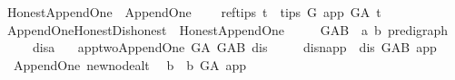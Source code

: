 \begin{isabellebody}
\isanewline
{}\isamarkupfalse%
\ Honest{\isacharunderscore}{\kern0pt}Append{\isacharunderscore}{\kern0pt}One\ {\isacharequal}{\kern0pt}\ Append{\isacharunderscore}{\kern0pt}One\ {\isacharplus}{\kern0pt}\isanewline
\ \ \ ref{\isacharunderscore}{\kern0pt}tips{\isacharcolon}{\kern0pt}\ {\isachardoublequoteopen}{\isasymforall}t\ {\isasymin}\ tips\ G{\isachardot}{\kern0pt}\ app\ {\isasymrightarrow}\isactrlbsub G{\isacharunderscore}{\kern0pt}A\isactrlesub \ t{\isachardoublequoteclose}\ \ \isanewline
\ \ \isanewline
{}\isamarkupfalse%
\ Append{\isacharunderscore}{\kern0pt}One{\isacharunderscore}{\kern0pt}Honest{\isacharunderscore}{\kern0pt}Dishonest\ {\isacharequal}{\kern0pt}\ Honest{\isacharunderscore}{\kern0pt}Append{\isacharunderscore}{\kern0pt}One\ {\isacharplus}{\kern0pt}\ \isanewline
\ \ \ G{\isacharunderscore}{\kern0pt}AB\ {\isacharcolon}{\kern0pt}{\isacharcolon}{\kern0pt}\ {\isachardoublequoteopen}{\isacharparenleft}{\kern0pt}{\isacharprime}{\kern0pt}a{\isacharcomma}{\kern0pt}\ {\isacharprime}{\kern0pt}b{\isacharparenright}{\kern0pt}\ pre{\isacharunderscore}{\kern0pt}digraph{\isachardoublequoteclose}\ {\isacharparenleft}{\kern0pt}\isanewline
\ \ \ \ \ dis{\isacharcolon}{\kern0pt}{\isacharcolon}{\kern0pt}{\isacharprime}{\kern0pt}a\isanewline
\ \ \ app{\isacharunderscore}{\kern0pt}two{\isacharcolon}{\kern0pt}{\isachardoublequoteopen}Append{\isacharunderscore}{\kern0pt}One\ G{\isacharunderscore}{\kern0pt}A\ G{\isacharunderscore}{\kern0pt}AB\ dis{\isachardoublequoteclose}\isanewline
\ \ \ \ \ dis{\isacharunderscore}{\kern0pt}n{\isacharunderscore}{\kern0pt}app{\isacharcolon}{\kern0pt}\ {\isachardoublequoteopen}{\isasymnot}\ dis\ {\isasymrightarrow}\isactrlbsub G{\isacharunderscore}{\kern0pt}AB\isactrlesub \ app{\isachardoublequoteclose}%
\isadelimdocument
%
\endisadelimdocument
%
\isatagdocument
%
\isamarkuptrue%
%
\endisatagdocument
{\isafolddocument}%
%
\isadelimdocument
%
\endisadelimdocument
{}\isamarkupfalse%
\ {\isacharparenleft}{\kern0pt}\ Append{\isacharunderscore}{\kern0pt}One{\isacharparenright}{\kern0pt}\ new{\isacharunderscore}{\kern0pt}node{\isacharunderscore}{\kern0pt}alt{\isacharcolon}{\kern0pt}\isanewline
\ \ {\isachardoublequoteopen}{\isacharparenleft}{\kern0pt}{\isasymforall}b{\isachardot}{\kern0pt}\ {\isasymnot}\ b\ {\isasymrightarrow}\isactrlbsub G{\isacharunderscore}{\kern0pt}A\isactrlesub \ app{\isacharparenright}{\kern0pt}{\isachardoublequoteclose}\ \isanewline

\end{isabellebody}
